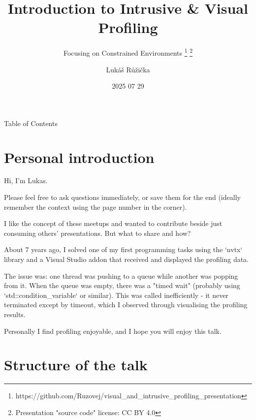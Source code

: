 \documentclass[aspectratio=169]{beamer}
\title{Introduction to Intrusive \& Visual Profiling}
\subtitle{Focusing on Constrained Environments \footnote{https://github.com/Ruzovej/visual\_and\_intrusive\_profiling\_presentation} \footnote{Presentation "source code" license: CC BY 4.0}}
\author{Lukáš Růžička}
\institute{Prague C++ Meetup}
\date{2025 07 29}
\begin{document}
\frame{\titlepage}

\begin{frame}{Table of Contents}
\tableofcontents[hideallsubsections]
\end{frame}




\section{Personal introduction}

\begin{frame}
    Hi, I'm Lukas.

    Please feel free to ask questions immediately, or save them for the end (ideally remember the context using the page number in the corner).

    I like the concept of these meetups and wanted to contribute beside just consuming others' presentations. But what to share and how?

    About 7 years ago, I solved one of my first programming tasks using the `nvtx` library and a Visual Studio addon that received and displayed the profiling data.

    The issue was: one thread was pushing to a queue while another was popping from it. When the queue was empty, there was a "timed wait" (probably using `std::condition\_variable` or similar). This was called inefficiently - it never terminated except by timeout, which I observed through visualising the profiling results.

    Personally I find profiling enjoyable, and I hope you will enjoy this talk.

\end{frame}



\section{Structure of the talk}
\end{document}
